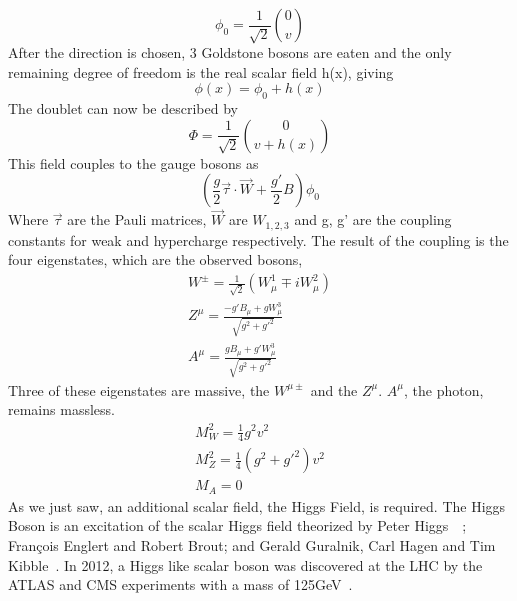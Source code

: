  
\begin{equation}
\phi_{0} = \frac{1}{\sqrt{2}} \binom{0}{v}
\end{equation}
After the direction is chosen, 3 Goldstone bosons are eaten and the only remaining degree of freedom is the real scalar field h(x), giving 
\begin{equation}
\phi(x) = \phi_{0} + h(x)
\end{equation}
The doublet can now be described by 
\begin{equation}
\Phi = \frac{1}{\sqrt{2}} \binom{0}{v+h(x)}
\end{equation}
This field couples to the gauge bosons as 
\begin{equation}
(\frac{g}{2}\overrightarrow{\tau}\cdot \overrightarrow{W} + \frac{g'}{2}B)\phi_{0}
\end{equation}
Where ${\overrightarrow{\tau}}$ are the Pauli matrices, ${\overrightarrow{W}}$ are ${W_{1,2,3}}$ and g, g' are the coupling constants for weak and hypercharge respectively. The result of the coupling is the four eigenstates, which are the observed bosons, 
\begin{equation}
\begin{split}
W^{\pm} = \frac{1}{\sqrt{2}}(W^{1}_{\mu} \mp iW^{2}_{\mu})\\
Z^{\mu} = \frac{-g'B_{\mu} + gW^{3}_{\mu}}{\sqrt{g^{2} + g'^{2}}}\\
A^{\mu} = \frac{gB_{\mu} + g'W^{3}_{\mu}}{\sqrt{g^{2} + g'^{2}}}
\end{split}
\end{equation}
Three of these eigenstates are massive, the $W^{\mu\pm}$ and the $Z^{\mu}$. $A^{\mu}$, the photon, remains massless.
\begin{equation}
\begin{split}
M^{2}_{W} = \frac{1}{4}g^{2}v^{2} \\
M^{2}_{Z} = \frac{1}{4}(g^{2} + g'^{2})v^{2} \\
M_{A} = 0
\end{split}
\end{equation}
As we just saw, an additional scalar field, the Higgs Field, is required.\newline
\indent The Higgs Boson is an excitation of the scalar Higgs field theorized by Peter Higgs~\cite{PhysRevLett.13.508}~\cite{HIGGS1964132}; François Englert and Robert Brout\cite{PhysRevLett.13.321}; and Gerald Guralnik, Carl Hagen and Tim Kibble~\cite{PhysRevLett.13.585}. In 2012, a Higgs like scalar boson was discovered at the LHC by the ATLAS and CMS experiments with a mass of 125GeV~\cite{Aad:2012tfa}.


